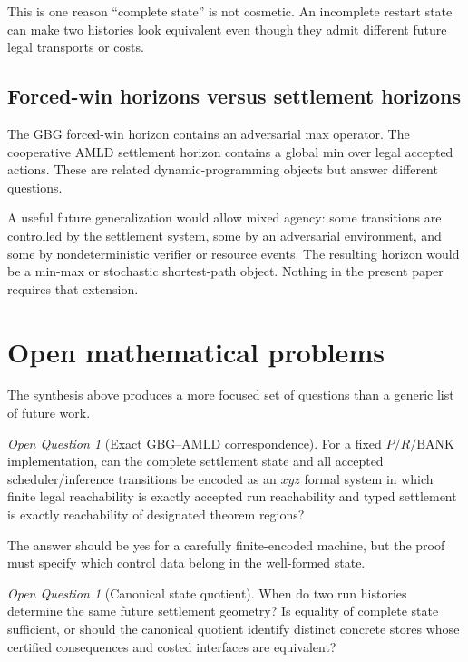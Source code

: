 \documentclass[11pt]{article}
\theoremstyle{remark}
\newtheorem{question}[definition]{Open Question}
\newcommand{\BANK}{\ensuremath{\mathrm{BANK}}}
\begin{document}
This is one reason ``complete state'' is not cosmetic. An incomplete restart state can make two histories look equivalent even though they admit different future legal transports or costs.

\subsection{Forced-win horizons versus settlement horizons}

The GBG forced-win horizon contains an adversarial max operator. The cooperative AMLD settlement horizon contains a global min over legal accepted actions. These are related dynamic-programming objects but answer different questions.

A useful future generalization would allow mixed agency: some transitions are controlled by the settlement system, some by an adversarial environment, and some by nondeterministic verifier or resource events. The resulting horizon would be a min-max or stochastic shortest-path object. Nothing in the present paper requires that extension.

\section{Open mathematical problems}

The synthesis above produces a more focused set of questions than a generic list of future work.

\begin{question}[Exact GBG--AMLD correspondence]
For a fixed $P/R/\BANK$ implementation, can the complete settlement state and all accepted scheduler/inference transitions be encoded as an $xyz$ formal system in which finite legal reachability is exactly accepted run reachability and typed settlement is exactly reachability of designated theorem regions?
\end{question}

The answer should be yes for a carefully finite-encoded machine, but the proof must specify which control data belong in the well-formed state.

\begin{question}[Canonical state quotient]
When do two run histories determine the same future settlement geometry? Is equality of complete state sufficient, or should the canonical quotient identify distinct concrete stores whose certified consequences and costed interfaces are equivalent?
\end{question}
\end{document}
